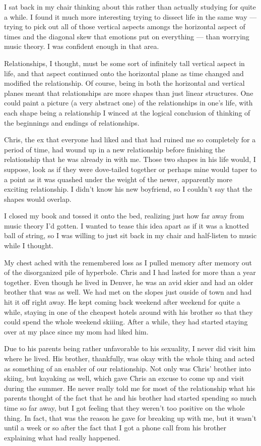 I sat back in my chair thinking about this rather than actually studying for quite a while.  I found it much more interesting trying to dissect life in the same way --- trying to pick out all of those vertical aspects amongs the horizontal aspect of times and the diagonal skew that emotions put on everything --- than worrying music theory.  I was confident enough in that area.

Relationships, I thought, must be some sort of infinitely tall vertical aspect in life, and that aspect continued onto the horizontal plane as time changed and modified the relationship.  Of course, being in both the horizontal and vertical planes meant that relationships are more shapes than just linear structures.  One could paint a picture (a very abstract one) of the relationships in one's life, with each shape being a relationship  I winced at the logical conclusion of thinking of the beginnings and endings of relationships.

Chris, the ex that everyone had liked and that had ruined me so completely for a period of time, had wound up in a new relationship before finishing the relationship that he was already in with me.  Those two shapes in his life would, I suppose, look as if they were dove-tailed together or perhaps mine would taper to a point as it was quashed under the weight of the newer, apparently more exciting relationship.  I didn't know his new boyfriend, so I couldn't say that the shapes would overlap.

I closed my book and tossed it onto the bed, realizing just how far away from music theory I'd gotten.  I wanted to tease this idea apart as if it was a knotted ball of string, so I was willing to just sit back in my chair and half-listen to music while I thought.

My chest ached with the remembered loss as I pulled memory after memory out of the disorganized pile of hyperbole.  Chris and I had lasted for more than a year together.  Even though he lived in Denver, he was an avid skier and had an older brother that was as well.  We had met on the slopes just ouside of town and had hit it off right away.  He kept coming back weekend after weekend for quite a while, staying in one of the cheapest hotels around with his brother so that they could spend the whole weekend skiiing.  After a while, they had started staying over at my place since my mom had liked him.

Due to his parents being rather unfavorable to his sexuality, I never did visit him where he lived.  His brother, thankfully, was okay with the whole thing and acted as something of an enabler of our relationship.  Not only was Chris' brother into skiing, but kayaking as well, which gave Chris an excuse to come up and visit during the summer.  He never really told me for most of the relationship what his parents thought of the fact that he and his brother had started spending so much time so far away, but I got feeling that they weren't too positive on the whole thing.  In fact, that was the reason he gave for breaking up with me, but it wasn't until a week or so after the fact that I got a phone call from his brother explaining what had really happened.

